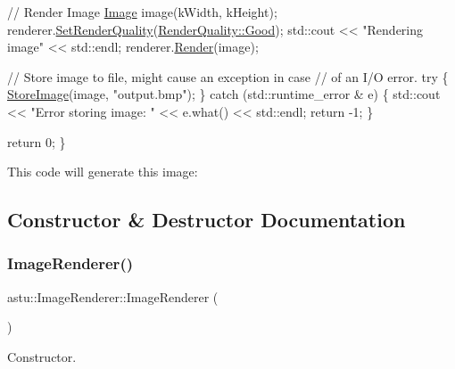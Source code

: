 \begin{DoxyCode}
  \textcolor{comment}{// Render Image }
  \hyperlink{classastu_1_1Image}{Image} image(kWidth, kHeight);
  renderer.\hyperlink{classastu_1_1ImageRenderer_a154491f8ef39881eeaba56f9d8ca24e8}{SetRenderQuality}(\hyperlink{group__gfx__group_ggac3b4955f341cea44f53f8446d734cd54a0c6ad70beb3a7e76c3fc7adab7c46acc}{RenderQuality::Good});
  std::cout << \textcolor{stringliteral}{"Rendering image"} << std::endl;
  renderer.\hyperlink{classastu_1_1ImageRenderer_a55172edcac396d7840da655697d57e28}{Render}(image);

  \textcolor{comment}{// Store image to file, might cause an exception in case}
  \textcolor{comment}{// of an I/O error.}
  \textcolor{keywordflow}{try} \{
    \hyperlink{group__gfx__group_gaca5f9cb8047c60049300242c20d30cd6}{StoreImage}(image, \textcolor{stringliteral}{"output.bmp"});
  \} \textcolor{keywordflow}{catch} (std::runtime\_error & e) \{
    std::cout << \textcolor{stringliteral}{"Error storing image: "} << e.what() << std::endl;
    \textcolor{keywordflow}{return} -1;
  \}

  \textcolor{keywordflow}{return} 0;
\}     
\end{DoxyCode}


This code will generate this image\+:

 

\subsection{Constructor \& Destructor Documentation}
\mbox{\label{classastu_1_1ImageRenderer_a88dc5f8ff5aa6a039c1c77c31bd5bb89}} 
\subsubsection{\texorpdfstring{Image\+Renderer()}{ImageRenderer()}}
{\footnotesize\ttfamily astu\+::\+Image\+Renderer\+::\+Image\+Renderer (\begin{DoxyParamCaption}{ }\end{DoxyParamCaption})}

Constructor. \mbox{\label{classastu_1_1ImageRenderer_ac35d79e814253e2a2755da114e05d05c}} 
